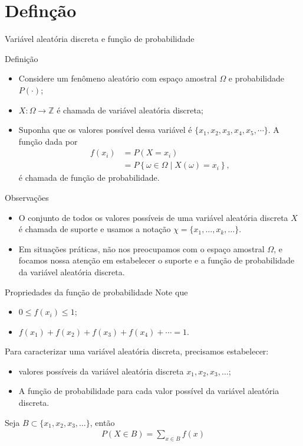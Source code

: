 \documentclass[9pt]{beamer}
\begin{document}
\section{Definção}

\begin{frame}{Variável aleatória discreta e função de probabilidade}
\begin{block}{Definição}
	\begin{itemize}
		\item Considere um fenômeno aleatório com espaço amostral $\Omega$ e  probabilidade $P(\cdot)$;
		\item $X: \Omega \rightarrow \mathbb{Z}$ é chamada de variável aleatória discreta;
		\item Suponha que os valores possível dessa variável é $\{x_1, x_2,x_3, x_4, x_5, \cdots\}$. A função dada por
		\begin{align*}
		f(x_i) &= P(X=x_i)\\
		&= P\left\{ \omega \in \Omega \mid X(\omega) = x_i \right\},
		\end{align*}
		é chamada de função de probabilidade.
	\end{itemize}
\end{block}

\begin{block}{Observações}
 \begin{itemize}
  \item O conjunto de todos os valores possíveis de uma variável aleatória discreta $X$ é chamada de suporte e usamos a notação $\chi=\{x_1, \dots, x_k, \dots\}.$
  \item Em situações práticas, não nos preocupamos com o espaço amostral $\Omega$, e focamos  nossa atenção em estabelecer o suporte e a função de probabilidade da variável aleatória discreta.
 \end{itemize}

\end{block}


\end{frame}

\begin{frame}{Propriedades da função de probabilidade}
Note que 
\vfill
\begin{itemize}
	\item $0 \leq f(x_i) \leq 1$;
	\vfill
	\item $f(x_1) + f(x_2) + f(x_3) + f(x_4) + \cdots  = 1$.
	\vfill
\end{itemize}

Para caracterizar uma variável aleatória discreta, precisamos estabelecer:
\begin{itemize}
	\item valores possíveis da variável aleatória discreta $x_1, x_2, x_3, \dots$;
	\vfill
	\item A função de probabilidade para cada valor possível da variável aleatória discreta.
	\vfill
\end{itemize}
Seja $B \subset \{x_1, x_2,x_3, \dots\}$, então
	\begin{align*}
	P(X \in B) = \sum_{x \in B} f(x)
	\end{align*}
\end{frame}
\end{document}
